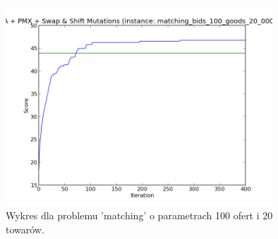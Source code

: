 \begin{figure}[ht!]
    \centering
    \includegraphics[width=10cm]{wykresy/matching_bids_100_goods_20_0000_txt_uniq.png}
    \caption{Wykres dla problemu 'matching' o parametrach 100 ofert i 20 towarów.}
    \label{wyk:sga4}
\end{figure}


